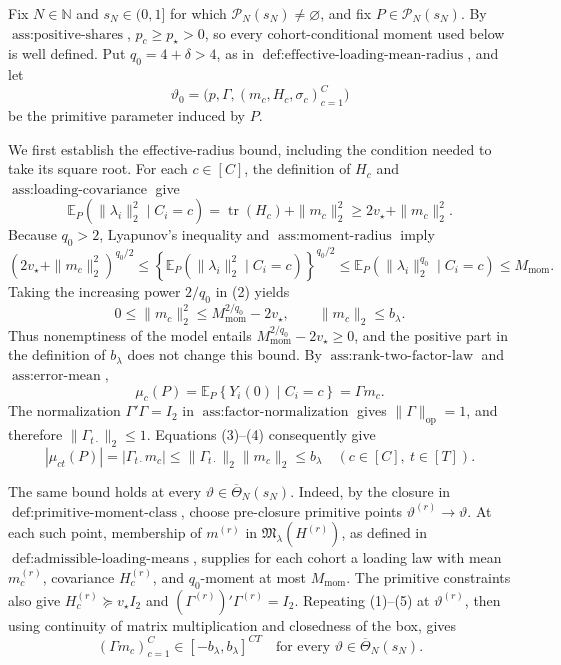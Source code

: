 Fix \(N\in\mathbb N\) and \(s_N\in(0,1]\) for which \(\mathcal P_N(s_N)\neq\varnothing\), and fix \(P\in\mathcal P_N(s_N)\).  By \(\operatorname{ass:positive\text{-}shares}\), \(p_c\geq p_\star>0\), so every cohort-conditional moment used below is well defined.  Put \(q_0=4+\delta>4\), as in \(\operatorname{def:effective\text{-}loading\text{-}mean\text{-}radius}\), and let
\[
 \vartheta_0=\bigl(p,\Gamma,(m_c,H_c,\sigma_c)_{c=1}^C\bigr)
\]
be the primitive parameter induced by \(P\).

We first establish the effective-radius bound, including the condition needed to take its square root.  For each \(c\in[C]\), the definition of \(H_c\) and \(\operatorname{ass:loading\text{-}covariance}\) give
\[
 \mathbb E_P\!\left(\|\lambda_i\|_2^2\mid C_i=c\right)
 =\operatorname{tr}(H_c)+\|m_c\|_2^2
 \geq 2v_\star+\|m_c\|_2^2.
 \tag{1}
\]
Because \(q_0>2\), Lyapunov's inequality and \(\operatorname{ass:moment\text{-}radius}\) imply
\[
 \left(2v_\star+\|m_c\|_2^2\right)^{q_0/2}
 \leq
 \left\{\mathbb E_P\!\left(\|\lambda_i\|_2^2\mid C_i=c\right)\right\}^{q_0/2}
 \leq
 \mathbb E_P\!\left(\|\lambda_i\|_2^{q_0}\mid C_i=c\right)
 \leq M_{\mathrm{mom}}.
 \tag{2}
\]
Taking the increasing power \(2/q_0\) in (2) yields
\[
 0\leq\|m_c\|_2^2
 \leq M_{\mathrm{mom}}^{2/q_0}-2v_\star,
 \qquad
 \|m_c\|_2\leq b_\lambda.
 \tag{3}
\]
Thus nonemptiness of the model entails \(M_{\mathrm{mom}}^{2/q_0}-2v_\star\geq0\), and the positive part in the definition of \(b_\lambda\) does not change this bound.  By \(\operatorname{ass:rank\text{-}two\text{-}factor\text{-}law}\) and \(\operatorname{ass:error\text{-}mean}\),
\[
 \mu_c(P)=\mathbb E_P\!\left\{Y_i(0)\mid C_i=c\right\}=\Gamma m_c.
 \tag{4}
\]
The normalization \(\Gamma'\Gamma=I_2\) in \(\operatorname{ass:factor\text{-}normalization}\) gives \(\|\Gamma\|_{\mathrm{op}}=1\), and therefore \(\|\Gamma_{t\cdot}\|_2\leq1\).  Equations (3)--(4) consequently give
\[
 |\mu_{ct}(P)|=|\Gamma_{t\cdot}m_c|
 \leq\|\Gamma_{t\cdot}\|_2\|m_c\|_2
 \leq b_\lambda
 \quad(c\in[C],\ t\in[T]).
 \tag{5}
\]

The same bound holds at every \(\vartheta\in\overline\Theta_N(s_N)\).  Indeed, by the closure in \(\operatorname{def:primitive\text{-}moment\text{-}class}\), choose pre-closure primitive points \(\vartheta^{(r)}\to\vartheta\).  At each such point, membership of \(m^{(r)}\) in \(\mathfrak M_\lambda(H^{(r)})\), as defined in \(\operatorname{def:admissible\text{-}loading\text{-}means}\), supplies for each cohort a loading law with mean \(m_c^{(r)}\), covariance \(H_c^{(r)}\), and \(q_0\)-moment at most \(M_{\mathrm{mom}}\).  The primitive constraints also give \(H_c^{(r)}\succeq v_\star I_2\) and \((\Gamma^{(r)})'\Gamma^{(r)}=I_2\).  Repeating (1)--(5) at \(\vartheta^{(r)}\), then using continuity of matrix multiplication and closedness of the box, gives
\[
 (\Gamma m_c)_{c=1}^C\in[-b_\lambda,b_\lambda]^{CT}
 \quad\text{for every }\vartheta\in\overline\Theta_N(s_N).
 \tag{6}
\]

